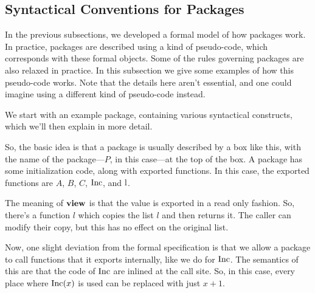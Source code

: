 \subsection{Syntactical Conventions for Packages}

In the previous subsections, we developed a formal model of
how packages work.
In practice, packages are described using a kind of pseudo-code,
which corresponds with these formal objects.
Some of the rules governing packages are also relaxed
in practice.
In this subsection we give some examples of how this pseudo-code
works.
Note that the details here aren't essential, and one could imagine
using a different kind of pseudo-code instead.

We start with an example package, containing various syntactical constructs,
which we'll then explain in more detail.


So, the basic idea is that a package is usually described
by a box like this, with the name of the package---$P$, in this case---at
the top of the box.
A package has some initialization code,
along with exported functions.
In this case, the exported functions are $A$, $B$, $C$,
$\text{Inc}$, and $\text{l}$.

The meaning of $\textbf{view}$ is that the value is exported
in a read only fashion.
So, there's a function $l$ which copies the list $l$
and then returns it.
The caller can modify their copy, but this has no effect on the original
list.

Now, one slight deviation from the formal specification is that
we allow a package to call functions that it exports internally,
like we do for $\text{Inc}$.
The semantics of this are that the code of $\text{Inc}$ are inlined
at the call site.
So, in this case, every place where $\text{Inc}(x)$ is used
can be replaced with just $x + 1$.

